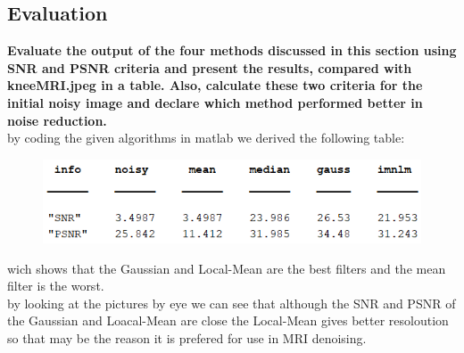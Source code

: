 \documentclass[11pt]{article}
\begin{document}
\subsection{Evaluation}
\textbf{Evaluate the output of the four methods discussed in this section using SNR and PSNR
criteria and present the results, compared with kneeMRI.jpeg in a table. Also, calculate these
two criteria for the initial noisy image and declare which method performed better in noise
reduction.} \\


by coding the given algorithms in matlab we derived the following table:
\begin{figure}[H]
    \begin{center}
        \includegraphics[scale=1]{Fig/eval.png}
        \label{fig:Evaluation}
    \end{center}
\end{figure}
wich shows that the Gaussian and Local-Mean are the best filters and the mean filter
is the worst. \\
by looking at the pictures by eye we can see that although the SNR and PSNR of the Gaussian and Loacal-Mean
are close the Local-Mean gives better resoloution so that may be the reason it is prefered for use in MRI denoising.
\end{document}
